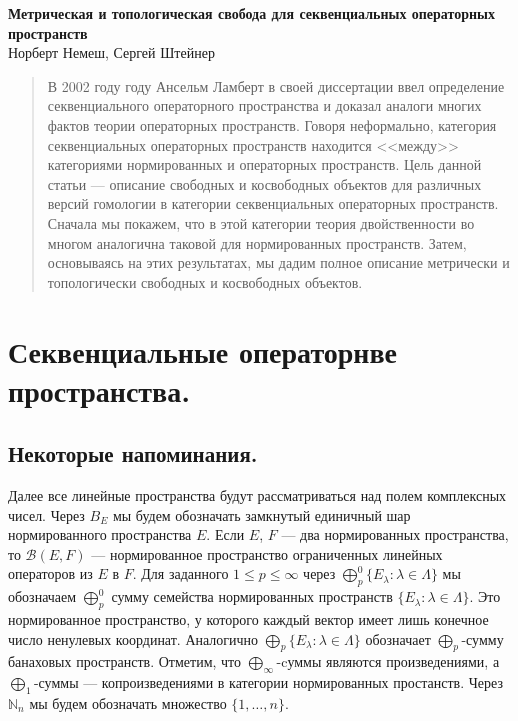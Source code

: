 \documentclass[12pt]{article}
\begin{document}
\begin{center}

\Large \textbf{Метрическая и топологическая свобода для секвенциальных операторных пространств}\\[0.5cm]
\small {Норберт Немеш, Сергей Штейнер}\\[0.5cm]

\end{center}
\thispagestyle{empty}

\begin{abstract}
В 2002 году году Ансельм Ламберт в своей диссертации \cite{LamOpFolgen} ввел определение секвенциального операторного пространства и доказал аналоги многих фактов теории операторных пространств. Говоря неформально, категория секвенциальных операторных пространств находится   <<между>> категориями нормированных и операторных пространств. Цель данной статьи --- описание свободных и косвободных объектов для различных версий  гомологии в категории секвенциальных операторных пространств. Сначала мы покажем, что в этой категории теория двойственности во многом аналогична таковой для нормированных пространств. Затем, основываясь на этих результатах, мы дадим полное описание метрически и топологически свободных и косвободных объектов.
\end{abstract}


\section{Секвенциальные операторнве пространства.}


\subsection{Некоторые напоминания.}

Далее все линейные пространства будут рассматриваться над полем комплексных чисел. Через $B_E$ мы будем обозначать замкнутый единичный шар нормированного пространства $E$. Если $E$, $F$ --- два нормированных пространства, то $\mathcal{B}(E, F)$ --- нормированное пространство ограниченных линейных операторов из $E$ в $F$. Для заданного $1\leq p\leq\infty$ через $\bigoplus_p^0\{E_\lambda:\lambda\in\Lambda\}$ мы обозначаем $\bigoplus_p^0$ сумму семейства нормированных пространств $\{E_\lambda:\lambda\in\Lambda\}$. Это нормированное пространство, у которого каждый вектор имеет лишь конечное число ненулевых координат. Аналогично $\bigoplus_p\{E_\lambda:\lambda\in\Lambda\}$ обозначает $\bigoplus_p$-сумму банаховых пространств. Отметим, что $\bigoplus_\infty$-cуммы являются произведениями, а $\bigoplus_1$-суммы --- копроизведениями в категории нормированных простанств. Через $\mathbb{N}_n$ мы будем обозначать множество $\{1,\ldots,n\}$.
\end{document}
